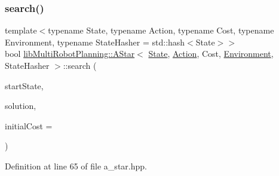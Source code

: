 \subsubsection{\texorpdfstring{search()}{search()}}
{\footnotesize\ttfamily template$<$typename State, typename Action, typename Cost, typename Environment, typename State\+Hasher = std\+::hash$<$\+State$>$$>$ \\
bool \hyperlink{classlib_multi_robot_planning_1_1_a_star}{lib\+Multi\+Robot\+Planning\+::\+A\+Star}$<$ \hyperlink{structlib_multi_robot_planning_1_1_state}{State}, \hyperlink{namespacelib_multi_robot_planning_aba73fb71693f86a324adfa0e41e1053d}{Action}, Cost, \hyperlink{classlib_multi_robot_planning_1_1_environment}{Environment}, State\+Hasher $>$\+::search (\begin{DoxyParamCaption}\item[{const \hyperlink{structlib_multi_robot_planning_1_1_state}{State} \&}]{start\+State,  }\item[{\hyperlink{structlib_multi_robot_planning_1_1_plan_result}{Plan\+Result}$<$ \hyperlink{structlib_multi_robot_planning_1_1_state}{State}, \hyperlink{namespacelib_multi_robot_planning_aba73fb71693f86a324adfa0e41e1053d}{Action}, Cost $>$ \&}]{solution,  }\item[{Cost}]{initial\+Cost = {} }\end{DoxyParamCaption})\hspace{0.3cm}{\ttfamily [inline]}}



Definition at line 65 of file a\+\_\+star.\+hpp.

